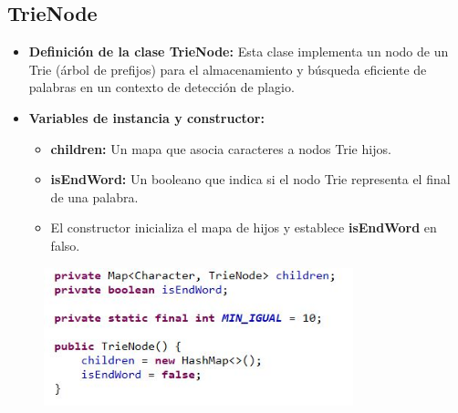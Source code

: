 \documentclass{article}
\begin{document}
	 \subsection{TrieNode}
	 \begin{itemize}
	\item \textbf{Definición de la clase TrieNode:} Esta clase implementa un nodo de un Trie (árbol de prefijos) para el almacenamiento y búsqueda eficiente de palabras en un contexto de detección de plagio.
	\end{itemize}
	
	\begin{itemize}
	\item \textbf{Variables de instancia y constructor:}
	 \begin{itemize}
	 \item \textbf{children:} Un mapa que asocia caracteres a nodos Trie hijos.
	 \item \textbf{isEndWord:} Un booleano que indica si el nodo Trie representa el final de una palabra.
	 \item El constructor inicializa el mapa de hijos y establece \textbf{isEndWord} en falso.
	 \end{itemize}
	\end{itemize}
	 \begin{figure}[H]
		\centering
		\includegraphics[width=0.8\textwidth,keepaspectratio]{img/TN1.jpg}
	\end{figure}
	
\end{document}

